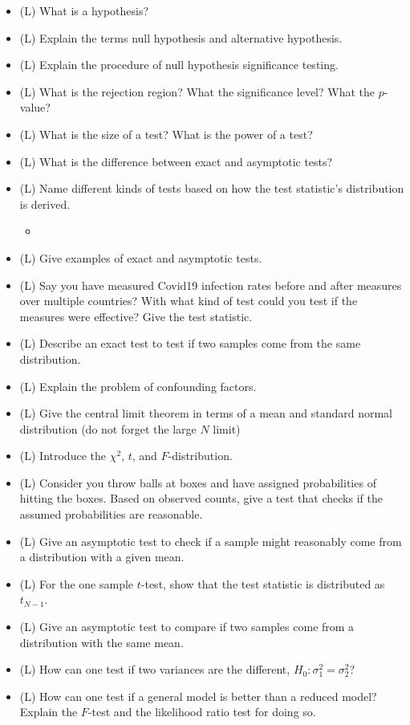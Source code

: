 \begin{itemize}
    \item (L) What is a hypothesis?
    \answerboxS
    \item (L) Explain the terms null hypothesis and alternative hypothesis.
    \answerboxS
    \item (L) Explain the procedure of null hypothesis significance testing.
    \answerboxL
    \item (L) What is the rejection region? What the significance level? What the $p$-value?
    \answerboxM
    \item (L) What is the size of a test? What is the power of a test?
    \answerboxS
    \item (L) What is the difference between exact and asymptotic tests?
    \answerboxS
    \item (L) Name different kinds of tests based on how the test statistic's distribution is derived.
    \begin{itemize}
        \item {}
    \end{itemize}
    \answerboxM
    \item (L) Give examples of exact and asymptotic tests.
    \answerboxM
    \item (L) Say you have measured Covid19 infection rates before and after measures over multiple countries? With what kind of test could you test if the measures were effective? Give the test statistic.
    \answerboxM
    \item (L) Describe an exact test to test if two samples come from the same distribution.
    \answerboxM
    \item (L) Explain the problem of confounding factors.
    \answerboxM
    \item (L) Give the central limit theorem in terms of a mean and standard normal distribution (do not forget the large $N$ limit)
    \answerboxM
    \item (L) Introduce the $\chi^2$, $t$, and $F$-distribution.
    \answerboxL
    \item (L) Consider you throw balls at boxes and have assigned probabilities of hitting the boxes. Based on observed counts, give a test that checks if the assumed probabilities are reasonable.
    \answerboxM
    \item (L) Give an asymptotic test to check if a sample might reasonably come from a distribution with a given mean.
    \answerboxL
    \item (L) For the one sample $t$-test, show that the test statistic is distributed as $t_{N-1}$.
    \answerboxL
    \item (L) Give an asymptotic test to compare if two samples come from a distribution with the same mean.
    \answerboxM
    \item (L) How can one test if two variances are the different, $H_0: \sigma_1^2 = \sigma_2^2$?
    \answerboxM
    \item (L) How can one test if a general model is better than a reduced model? Explain the $F$-test and 
    the likelihood ratio test for doing so.
    \answerboxL
\end{itemize}

